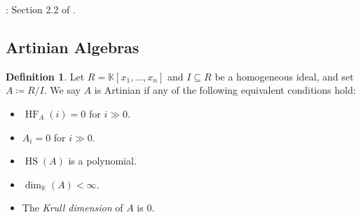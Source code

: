 \documentclass[12pt,a4paper]{article}
\newcommand{\KK}{\mathbb{K}}
\DeclareMathOperator{\HF}{HF}
\DeclareMathOperator{\HS}{HS}
\theoremstyle{definition}
\newtheorem{definition}[theorem]{Definition}
\numberwithin{equation}{section}
\begin{document}
\vspace*{1cm}

: Section 2.2 of \cite{schenck_computational_2003}.

\vspace*{1cm}


\subsection{Artinian Algebras}
\begin{definition}
    Let $R = \KK[x_1,\dots,x_n]$ and $I \subseteq R$ be a homogeneous ideal, and set $A \coloneqq R/I$.
    We say $A$ is Artinian if any of the following equivalent conditions hold:
    \begin{itemize}
        \item $\HF_A(i) = 0$ for $i \gg 0$.
        \item $A_i = 0$ for $i \gg 0$.
        \item $\HS(A)$ is a polynomial.
        \item $\dim_\KK(A) < \infty$.
        \item The \emph{Krull dimension} of $A$ is $0$.
    \end{itemize}
\end{definition}
\end{document}
